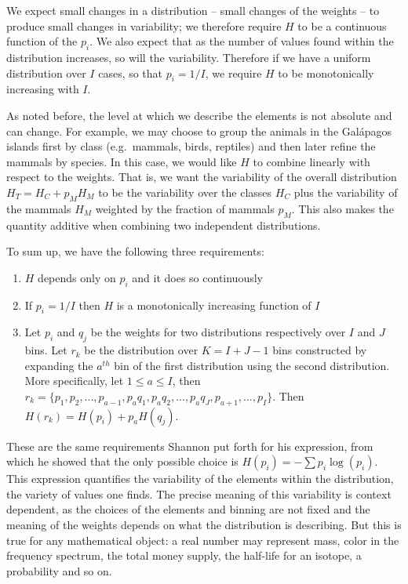 \documentclass[prb, twocolumn]{revtex4-1}
\begin{document}
We  expect small changes in a distribution -- small changes of the weights -- to produce small changes in variability; we therefore require $H$ to be a continuous function of the $p_i$. We also expect that as the number of values found within the distribution increases, so will the variability. Therefore if we have a uniform distribution over $I$ cases, so that $p_i = 1/I$, we require $H$ to be monotonically increasing with $I$.

As noted before, the level at which we describe the elements is not absolute and can change. For example, we may choose to group the animals in the Gal\'{a}pagos islands first by class (e.g.~mammals, birds, reptiles) and then later refine the mammals by species. In this case, we would like $H$ to combine linearly with respect to the weights. That is, we want the variability of the overall distribution $H_T = H_C + p_M H_M$ to be the variability over the classes $H_C$ plus the variability of the mammals $H_M$ weighted by the fraction of mammals $p_M$. This also makes the quantity additive when combining two independent distributions.

To sum up, we have the following three requirements:
\begin{enumerate}
\item $H$ depends only on $p_i$ and it does so continuously
\item If $p_i=1/I$ then $H$ is a monotonically increasing function of $I$
\item Let $p_i$ and $q_j$ be the weights for two distributions respectively over $I$ and $J$ bins. Let $r_k$ be the distribution over $K=I+J-1$ bins constructed by expanding the $a^{th}$ bin of the first distribution using the second distribution. More specifically, let $1 \leq a \leq I$, then $r_k = \{p_1, p_2, ..., p_{a-1}, p_{a}q_1, p_{a}q_2, ..., p_{a}q_J, p_{a+1}, ..., p_I \}$. Then $H(r_k) = H(p_i) + p_{a} H(q_j)$.
\end{enumerate}
These are the same requirements Shannon put forth for his expression\cite{Shannon}, from which he showed that the only possible choice is $H(p_i) = - \sum p_i \log(p_i)$. This expression quantifies the variability of the elements within the distribution, the variety of values one finds. The precise meaning of this variability is context dependent, as the choices of the elements and binning are not fixed and the meaning of the weights depends on what the distribution is describing. But this is true for any mathematical object: a real number may represent mass, color in the frequency spectrum, the total money supply, the half-life for an isotope, a probability and so on.
\end{document}
